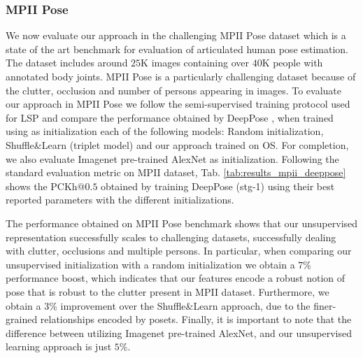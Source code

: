 \documentclass[10pt,twocolumn,letterpaper]{article}
\begin{document}
\subsubsection{MPII Pose}

We now evaluate our approach in the challenging MPII Pose dataset \cite{mpii} which is a state of the art benchmark for evaluation of articulated human pose estimation. The dataset includes around $25$K images containing over $40$K people with annotated body joints. MPII Pose is a particularly challenging dataset because of the clutter, occlusion and number of persons appearing in images. To evaluate our approach in MPII Pose we follow the semi-supervised training protocol used for LSP and compare the performance obtained by DeepPose \cite{deeppose}, when trained using as initialization each of the following models: Random initialization, Shuffle\&Learn \cite{shuffleandlearn} (triplet model) and our approach trained on OS. For completion, we also evaluate Imagenet pre-trained AlexNet \cite{alexnet} as initialization. Following the standard evaluation metric on MPII dataset, Tab. \ref{tab:results_mpii_deeppose} shows the PCKh@$0.5$ obtained by training DeepPose (stg-1) using their best reported parameters with the different initializations. 


The performance obtained on MPII Pose benchmark shows that our unsupervised representation successfully scales to challenging datasets, successfully dealing with clutter, occlusions and multiple persons. In particular, when comparing our unsupervised initialization with a random initialization we obtain a $7\%$ performance boost, which indicates that our features encode a robust notion of pose that is robust to the clutter present in MPII dataset. Furthermore, we obtain a $3\% $ improvement over the  Shuffle\&Learn \cite{shuffleandlearn} approach, due to the finer-grained relationships encoded by posets. Finally, it is important to note that the difference between utilizing Imagenet pre-trained AlexNet\cite{alexnet}, and our unsupervised learning approach is just $5\%$.
\end{document}
